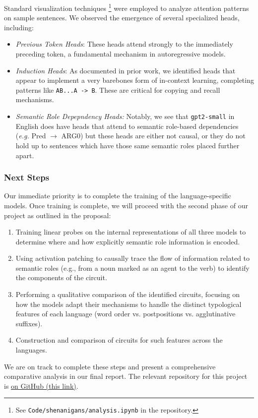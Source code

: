 \documentclass[11pt]{article}
\begin{document}
Standard visualization techniques \footnote{See \texttt{Code/shenanigans/analysis.ipynb} in the repository.} were employed to analyze attention patterns on sample sentences. We observed the emergence of several specialized heads, including:

\begin{itemize}
\item \emph{Previous Token Heads}: These heads attend strongly to the immediately preceding token, a fundamental mechanism in autoregressive models.
\item \emph{Induction Heads}: As documented in prior work, we identified heads that appear to implement a very barebones form of in-context learning, completing patterns like \texttt{AB...A -> B}. These are critical for copying and recall mechanisms.
\item \emph{Semantic Role Depepndency Heads:} Notably, we see that \texttt{gpt2-small} in English does have heads that attend to semantic role-based dependencies (\emph{e.g.} Pred \(\rightarrow\) ARG0) but these heads are either not causal, or they do not hold up to sentences which have those same semantic roles placed further apart.
\end{itemize}
\subsubsection*{Next Steps}
\label{sec:org6fcac66}

Our immediate priority is to complete the training of the language-specific models. Once training is complete, we will proceed with the second phase of our project as outlined in the proposal:

\begin{enumerate}
\item Training linear probes on the internal representations of all three models to determine where and how explicitly semantic role information is encoded.
\item Using activation patching to causally trace the flow of information related to semantic roles (e.g., from a noun marked as an agent to the verb) to identify the components of the circuit.
\item Performing a qualitative comparison of the identified circuits, focusing on how the models adapt their mechanisms to handle the distinct typological features of each language (word order vs. postpositions vs. agglutinative suffixes).
\item Construction and comparison of circuits for such features across the languages.
\end{enumerate}

We are on track to complete these steps and present a comprehensive comparative analysis in our final report.
The relevant repository for this project is \href{https://github.com/DruhanShah/indic-morpho-semantic-circuits}{on GitHub (this link)}.



\end{document}
